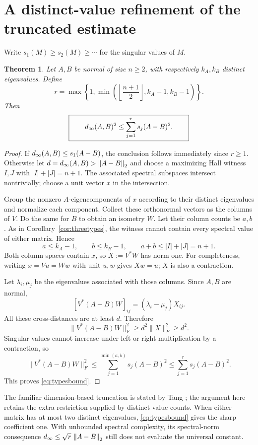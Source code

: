 \documentclass[11pt,letterpaper]{article}
\newtheorem{theorem}{Theorem}[section]\newtheorem{lemma}[theorem]{Lemma}\newtheorem{proposition}[theorem]{Proposition}\newtheorem{corollary}[theorem]{Corollary}
\theoremstyle{remark}\newtheorem{remark}[theorem]{Remark}
\newcommand{\norm}[1]{\left\lVert#1\right\rVert_2}\newcommand{\abs}[1]{\left|#1\right|}\newcommand{\diag}{\operatorname{diag}}\newcommand{\rank}{\operatorname{rank}}
\begin{document}
\section{A distinct-value refinement of the truncated estimate}\label{sec:truncated}
Write $s_1(M)\ge s_2(M)\ge\cdots$ for the singular values of $M$.
\begin{theorem}\label{thm:distinct}
Let $A,B$ be normal of size $n\ge2$, with respectively $k_A,k_B$ distinct eigenvalues. Define
\begin{equation}\label{eq:rtypes}
r=\max\left\{1,\min\left(\left\lfloor\frac{n+1}{2}\right\rfloor,k_A-1,k_B-1\right)\right\}.
\end{equation}
Then
\begin{equation}\label{eq:typesbound}
\boxed{\qquad d_{\infty}(A,B)^2\le\sum_{j=1}^{r}s_j(A-B)^2.\qquad}
\end{equation}
\end{theorem}
\begin{proof}
If $d_{\infty}(A,B)\le s_1(A-B)$, the conclusion follows immediately since $r\ge1$. Otherwise let $d=\din(A,B)>\norm{A-B}$ and choose a maximizing Hall witness $I,J$ with $|I|+|J|=n+1$. The associated spectral subspaces intersect nontrivially; choose a unit vector $x$ in the intersection.

Group the nonzero $A$-eigencomponents of $x$ according to their distinct eigenvalues and normalize each component. Collect these orthonormal vectors as the columns of $V$. Do the same for $B$ to obtain an isometry $W$. Let their column counts be $a,b$. As in Corollary~\ref{cor:threetypes}, the witness cannot contain every spectral value of either matrix. Hence
\[
a\le k_A-1,\qquad b\le k_B-1,\qquad a+b\le |I|+|J|=n+1.
\]
Both column spaces contain $x$, so $X:=V^*W$ has norm one. For completeness, writing $x=Vu=Ww$ with unit $u,w$ gives $Xw=u$; $X$ is also a contraction.

Let $\lambda_i,\mu_j$ be the eigenvalues associated with those columns. Since $A,B$ are normal,
\[
[V^*(A-B)W]_{ij}=(\lambda_i-\mu_j)X_{ij}.
\]
All these cross-distances are at least $d$. Therefore
\[
\|V^*(A-B)W\|_F^2
\ge d^2\|X\|_F^2\ge d^2.
\]
Singular values cannot increase under left or right multiplication by a contraction, so
\[
\|V^*(A-B)W\|_F^2
\le\sum_{j=1}^{\min(a,b)}s_j(A-B)^2
\le\sum_{j=1}^r s_j(A-B)^2.
\]
This proves \eqref{eq:typesbound}.
\end{proof}
The familiar dimension-based truncation is stated by Tang \cite{Tang}; the argument here retains the extra restriction supplied by distinct-value counts. When either matrix has at most two distinct eigenvalues, \eqref{eq:typesbound} gives the sharp coefficient one. With unbounded spectral complexity, its spectral-norm consequence $\din\le\sqrt r\,\norm{A-B}$ still does not evaluate the universal constant.
\end{document}

